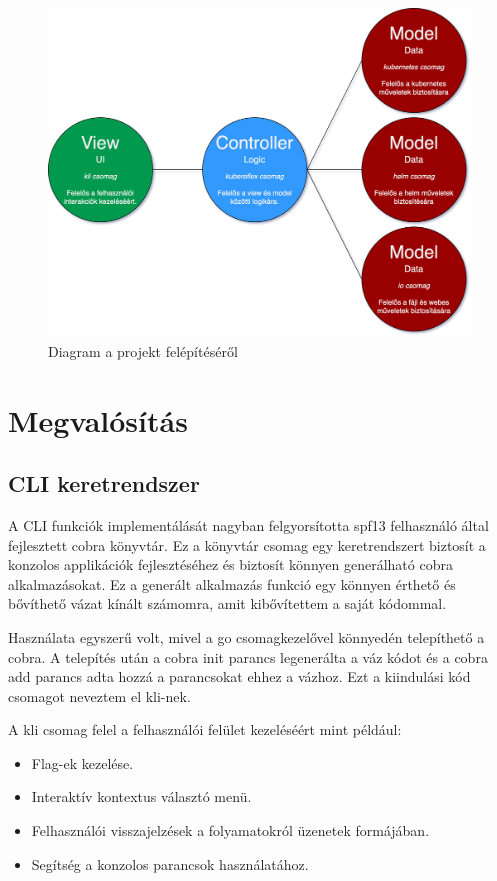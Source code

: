 \begin{figure}[ht]
  \centering
       \includegraphics[width=1.0\textwidth]{figures/kli/kli-mvc.png}
        \caption{Diagram a projekt felépítéséről}
         \label{kli-mvc}
\end{figure}

\section{Megvalósítás}

\subsection{CLI keretrendszer}
A CLI funkciók implementálását nagyban felgyorsította spf13 felhasználó által fejlesztett cobra könyvtár.
Ez a könyvtár csomag egy keretrendszert biztosít a konzolos applikációk fejlesztéséhez és biztosít könnyen generálható cobra alkalmazásokat.
Ez a generált alkalmazás funkció egy könnyen érthető és bővíthető vázat kínált számomra, amit kibővítettem a saját kódommal.

Használata egyszerű volt, mivel a go csomagkezelővel könnyedén telepíthető a cobra.
A telepítés után a cobra init parancs legenerálta a váz kódot és a cobra add parancs adta hozzá a parancsokat ehhez a vázhoz.
Ezt a kiindulási kód csomagot neveztem el kli-nek.

A kli csomag felel a felhasználói felület kezeléséért mint például:
\begin{itemize}
    \item Flag-ek kezelése.
    \item Interaktív kontextus választó menü.
    \item Felhasználói visszajelzések a folyamatokról üzenetek formájában.
    \item Segítség a konzolos parancsok használatához.
\end{itemize}

